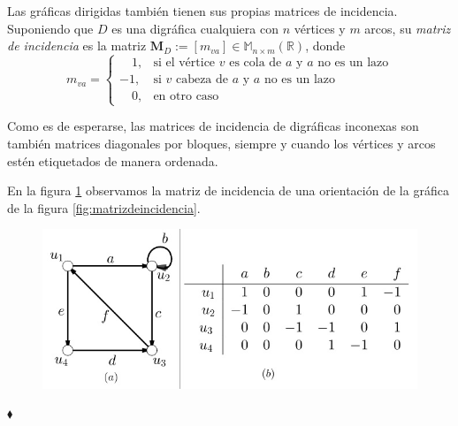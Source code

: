 Las gráficas dirigidas también tienen sus propias matrices de incidencia. Suponiendo que $D$ es una digráfica cualquiera con $n$ vértices y $m$ arcos, su \textit{matriz de incidencia} es la matriz $\mathbf{M}_{D}:= [m_{va}] \in \mathbb{M}_{n \times m}(\mathbb{R})$, donde
$$ m_{va}=
\begin{cases}
\quad \! 1, & \text{si el vértice } v \text{ es cola de } a \text{ y } a \text{ no es un lazo}\\ 
-1, & \text{si } v \text{ cabeza de } a \text{ y } a \text{ no es un lazo}\\ 
\quad \! 0, & \text{en otro caso}
\end{cases}
$$

Como es de esperarse, las matrices de incidencia de digráficas inconexas son también matrices diagonales por bloques, siempre y cuando los vértices y arcos estén etiquetados de manera ordenada.

\begin{ejem}
En la figura \ref{fig:matrizdeincidenciadigrafica} observamos la matriz de incidencia de una orientación de la gráfica de la figura \ref{fig:matrizdeincidencia}.
\begin{figure}[H]
    \centering
    \vspace{-0.8cm}
    \includegraphics[scale=0.6]{img/imgchapter1/matrizDeIncidenciaDigrafica.jpg}
    \caption{}
    \label{fig:matrizdeincidenciadigrafica}
\end{figure}
\vspace{-0.5cm}
\hfill $\blacklozenge$
\end{ejem}







 